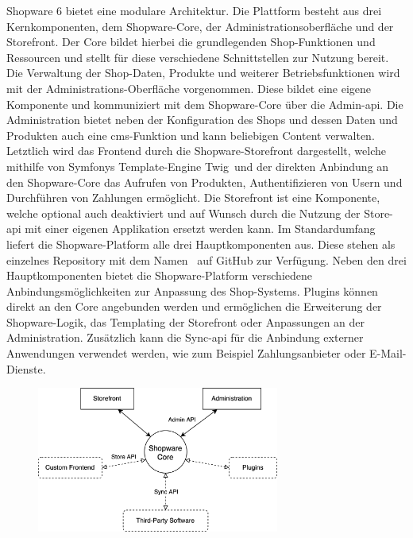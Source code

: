 Shopware 6 bietet eine modulare Architektur.
Die Plattform besteht aus drei Kernkomponenten, dem Shopware-Core, der Administrationsoberfläche und der Storefront.
Der Core bildet hierbei die grundlegenden Shop-Funktionen und Ressourcen und stellt für diese verschiedene
Schnittstellen zur Nutzung bereit.
Die Verwaltung der Shop-Daten, Produkte und weiterer Betriebsfunktionen wird mit der Administrations-Oberfläche
vorgenommen.
Diese bildet eine eigene Komponente und kommuniziert mit dem Shopware-Core über die Admin-\acrshort{api}.
Die Administration bietet neben der Konfiguration des Shops und dessen Daten und Produkten auch eine
\acrshort{cms}-Funktion und kann beliebigen Content verwalten.
Letztlich wird das Frontend durch die Shopware-Storefront dargestellt, welche mithilfe von Symfonys Template-Engine
\glqq Twig\grqq\ und der direkten Anbindung an den Shopware-Core das Aufrufen von Produkten, Authentifizieren von Usern
und Durchführen von Zahlungen ermöglicht.
Die Storefront ist eine Komponente, welche optional auch deaktiviert und auf Wunsch durch die
Nutzung der Store-\acrshort{api} mit einer eigenen Applikation ersetzt werden kann.
Im Standardumfang liefert die Shopware-Platform alle drei Hauptkomponenten aus.
Diese stehen als einzelnes Repository mit dem Namen\  auf GitHub zur Verfügung.
Neben den drei Hauptkomponenten bietet die Shopware-Platform verschiedene Anbindungsmöglichkeiten zur Anpassung des
Shop-Systems.
Plugins können direkt an den Core angebunden werden und ermöglichen die Erweiterung der Shopware-Logik, das Templating
der Storefront oder Anpassungen an der Administration.
Zusätzlich kann die Sync-\acrshort{api} für die Anbindung externer Anwendungen verwendet werden, wie zum Beispiel
Zahlungsanbieter oder E-Mail-Dienste.

\begin{figure}[H]
    \centering
    \includegraphics[width=0.71\textwidth]{images/content/shopware-architecture}
    \label{fig:shopware-architecture}
\end{figure}

